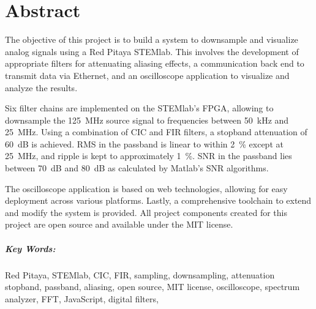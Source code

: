 %
%
\chapter*{Abstract} %
\label{ch:app:abstract}

The objective of this project is to build a system to downsample and visualize
analog signals  using a Red  Pitaya STEMlab. This involves the  development of
appropriate filters for attenuating aliasing effects, a communication back end
to transmit  data via Ethernet,  and an oscilloscope application  to visualize
and analyze the results.

Six  filter  chains  are  implemented  on  the  STEMlab's  FPGA,  allowing  to
downsample   the  \SI{125}{\MHz}   source   signal   to  frequencies   between
\SI{50}{\kHz} and \SI{25}{\MHz}.  Using a  combination of CIC and FIR filters,
a stopband  attenuation of  \SI{60}{\dB} is achieved. RMS  in the  passband is
linear  to within  \SI{2}{\percent}  except at  \SI{25}{\MHz},  and ripple  is
kept  to  approximately \SI{1}{\percent}. SNR  in  the  passband lies  between
\SI{70}{\dB} and \SI{80}{\dB} as calculated by Matlab's SNR algorithms.

The oscilloscope application  is based on web technologies,  allowing for easy
deployment  across various  platforms. Lastly,  a  comprehensive toolchain  to
extend and modify  the system is provided. All project  components created for
this project are open source and available under the MIT license.

\vfill

\paragraph{Key Words:} Red Pitaya, STEMlab,  CIC, FIR, sampling, downsampling,
attenuation   stopband,  passband,   aliasing,  open   source,  MIT   license,
oscilloscope, spectrum analyzer, FFT, JavaScript, digital filters,
